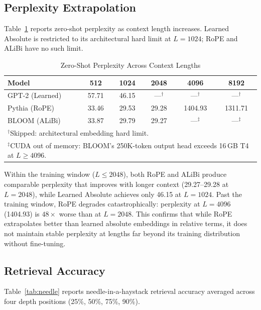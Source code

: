 \documentclass[conference]{IEEEtran}
\begin{document}
\subsection{Perplexity Extrapolation}

Table~\ref{tab:ppl} reports zero-shot perplexity as context length increases. Learned Absolute is restricted to its architectural hard limit at $L{=}1024$; RoPE and ALiBi have no such limit.

\begin{table}[!t]
\caption{Zero-Shot Perplexity Across Context Lengths}
\label{tab:ppl}
\centering
\begin{tabular}{lccccc}
\hline
\textbf{Model} & \textbf{512} & \textbf{1024} & \textbf{2048} & \textbf{4096} & \textbf{8192} \\
\hline
GPT-2 (Learned) & 57.71 & 46.15 & ---$^\dagger$ & ---$^\dagger$ & ---$^\dagger$ \\
Pythia (RoPE) & 33.46 & 29.53 & 29.28 & 1404.93 & 1311.71 \\
BLOOM (ALiBi) & 33.87 & 29.79 & 29.27 & ---$^\ddagger$ & ---$^\ddagger$ \\
\hline
\multicolumn{6}{l}{\small $^\dagger$Skipped: architectural embedding hard limit.} \\
\multicolumn{6}{l}{\small $^\ddagger$CUDA out of memory: BLOOM's 250K-token output head exceeds 16\,GB T4 at $L \geq 4096$.} \\
\end{tabular}
\end{table}

Within the training window ($L \leq 2048$), both RoPE and ALiBi produce comparable perplexity that improves with longer context (29.27--29.28 at $L{=}2048$), while Learned Absolute achieves only 46.15 at $L{=}1024$. Past the training window, RoPE degrades catastrophically: perplexity at $L{=}4096$ (1404.93) is $48\times$ worse than at $L{=}2048$. This confirms that while RoPE extrapolates better than learned absolute embeddings in relative terms, it does not maintain stable perplexity at lengths far beyond its training distribution without fine-tuning.

\subsection{Retrieval Accuracy}

Table~\ref{tab:needle} reports needle-in-a-haystack retrieval accuracy averaged across four depth positions (25\%, 50\%, 75\%, 90\%).
\end{document}
